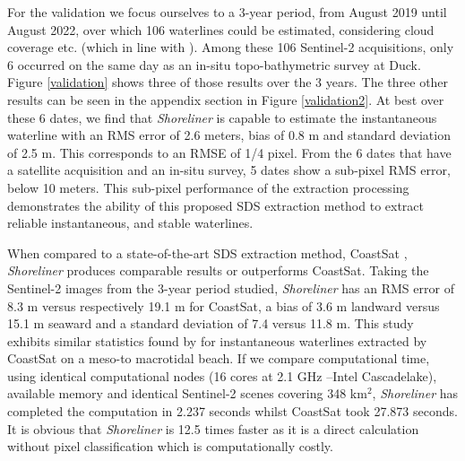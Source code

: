 \documentclass[remotesensing,technicalnote,submit,pdftex,moreauthors]{Definitions/mdpi}
\begin{document}
For the validation we focus ourselves to a 3-year period, from August 2019 until August 2022, over which 106 waterlines could be estimated, considering cloud coverage etc. (which in line with \citep{BERGSMA2020}). Among these 106 Sentinel-2 acquisitions, only 6 occurred on the same day as an in-situ topo-bathymetric survey at Duck. Figure \ref{validation} shows three of those results over the 3 years. The three other results can be seen in the appendix section in Figure \ref{validation2}. At best over these 6 dates, we find that \textit{Shoreliner} is capable to estimate the instantaneous waterline with an RMS error of 2.6 meters, bias of 0.8 m and standard deviation of 2.5 m. This corresponds to an RMSE of 1/4 pixel. From the 6 dates that have a satellite acquisition and an in-situ survey, 5 dates show a sub-pixel RMS error, below 10 meters. This sub-pixel performance of the extraction processing demonstrates the ability of this proposed SDS extraction method to extract reliable instantaneous, and stable waterlines. 

When compared to a state-of-the-art SDS extraction method, CoastSat \citep{VOS2019_sub}, \textit{Shoreliner} produces comparable results or outperforms CoastSat. Taking the Sentinel-2 images from the 3-year period studied, \textit{Shoreliner} has an RMS error of 8.3 m versus respectively 19.1 m for CoastSat, a bias of 3.6 m landward versus 15.1 m seaward and a standard deviation of 7.4 versus 11.8 m. This study exhibits similar statistics found by \citep{KONSTANTINOU2023} for instantaneous waterlines extracted by CoastSat on a meso-to macrotidal beach.
If we compare computational time, using identical computational nodes (16 cores at 2.1 GHz --Intel Cascadelake), available memory and identical Sentinel-2 scenes covering 348 km$^2$, \textit{Shoreliner} has completed the computation in 2.237 seconds whilst CoastSat took 27.873 seconds. It is obvious that \textit{Shoreliner} is 12.5 times faster as it is a direct calculation without pixel classification which is computationally costly.

\end{document}
